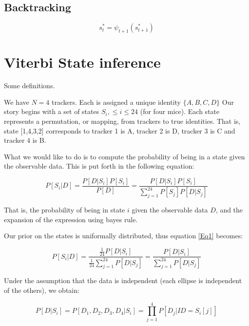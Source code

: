 \documentclass[12pt]{article}
\begin{document}
\subsection{Backtracking}
\begin{equation}
s_t^* = {\psi _{t + 1}}\left( {s_{t + 1}^*} \right)
 \end{equation}



\section{Viterbi State inference}

Some definitions.

We have $N = 4$ trackers. Each is assigned a unique identity $\{A,B,C,D\}$
Our story begins with a set of states $S_i, \le i \le 24$ (for four mice). Each state represents a permutation, or mapping, from trackers to true identities. That is, state [1,4,3,2] corresponds to tracker 1 is A, tracker 2 is D, tracker 3 is C and tracker 4 is B.

What we would like to do is to compute the probability of being in a state given the observable data.
This is put forth in the following equation:

\begin{equation}
\label{Eq1}
P\left[ {{S_i}|D} \right] = \frac{{P\left[ {D|{S_i}} \right]P\left[ {{S_i}} \right]}}{{P\left[ D \right]}} = \frac{{P\left[ {D|{S_i}} \right]P\left[ {{S_i}} \right]}}{{\sum\limits_{j = 1}^{24} {P\left[ {{S_j}} \right]} P\left[ {D|{S_j}} \right]}}
\end{equation}

That is, the probability of being in state $i$ given the observable data $D$, and the expansion of the expression using bayes rule.

Our prior on the states is uniformally distributed, thus equation \ref{Eq1} becomes:

\begin{equation}
\label{Eq2}
P\left[ {{S_i}|D} \right] = \frac{{ \frac{1}{24} P\left[ {D|{S_i}} \right]}}{{\frac{1}{24}\sum\limits_{j = 1}^{24} {P\left[ {D|{S_j}} \right]} }} = \frac{{P\left[ {D|{S_i}} \right]}}{{\sum\limits_{j = 1}^{24} {P\left[ {D|{S_j}} \right]} }}
\end{equation}

Under the assumption that the data is independent (each ellipse is independent of the others), we obtain:

\begin{equation}
\label{Eq2}
P\left[ {D|{S_i}} \right] = P\left[ {{D_1},{D_2},{D_3},{D_4}|{S_i}} \right] = \prod\limits_{j = 1}^4 {P\left[ {{D_j}|ID = {S_i}[j]} \right]}
\end{equation}
\end{document}
